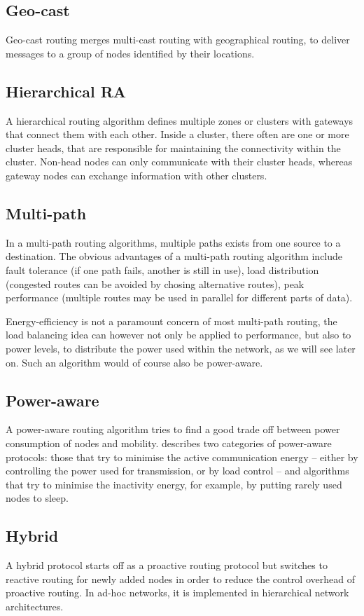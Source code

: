 \documentclass[conference]{IEEEtran}
\begin{document}
\subsection{Geo-cast}
Geo-cast routing merges multi-cast routing with geographical routing, to
deliver messages to a group of nodes identified by their locations.

\subsection{Hierarchical RA}
A hierarchical routing algorithm defines multiple zones or clusters with
gateways that connect them with each other. Inside a cluster, there often
are one or more cluster heads, that are responsible for maintaining the
connectivity within the cluster. Non-head nodes can only communicate with
their cluster heads, whereas gateway nodes can exchange information with
other clusters.


\subsection{Multi-path}
In a multi-path routing algorithms, multiple paths exists from one source
to a destination. The obvious advantages of a multi-path routing
algorithm include fault tolerance (if one path fails, another is still in
use), load distribution (congested routes can be avoided by chosing alternative
routes), peak performance (multiple routes may be used in parallel for different
parts of data).

Energy-efficiency is not a paramount concern of most multi-path routing, the
load balancing idea can however not only be applied to performance, but also
to power levels, to distribute the power used within the network, as we will
see later on. Such an algorithm would of course also be power-aware.

\subsection{Power-aware}
A power-aware routing algorithm tries to find a good trade off between
power consumption of nodes and mobility. \cite{main1} describes two categories
of power-aware protocols: those that try to minimise the active communication energy -- either
by controlling the power used for transmission, or by load control -- and
algorithms that try to minimise the inactivity energy, for example, by putting
rarely used nodes to sleep.

\subsection{Hybrid}
A hybrid protocol starts off as a proactive routing protocol but switches
to reactive routing for newly added nodes in order to reduce the control
overhead of proactive routing. In ad-hoc networks, it is implemented in
hierarchical network architectures.
\end{document}
